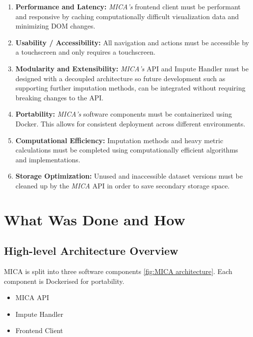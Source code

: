 \documentclass[a4paper, 11pt]{article}
\newcommand{\mica}{\textit{MICA }}
\newcommand{\micas}{\textit{MICA's }}
\begin{document}
\begin{enumerate}[label=N.F.R.\arabic*]

        \item \textbf{Performance and Latency:} \micas frontend client must be
                performant and responsive by caching computationally difficult
                visualization data and minimizing DOM changes.

        \item \textbf{Usability / Accessibility:} All navigation and actions
                must be accessible by a touchscreen and only requires a
                touchscreen.  

        \item \textbf{Modularity and Extensibility:} \micas API and Impute
                Handler must be designed with a decoupled architecture so
                future development such as supporting further imputation
                methods, can be integrated without requiring breaking changes
                to the API.

        \item \textbf{Portability:} \micas software components must be
                containerized using Docker. This allows for consistent
                deployment across different environments.

        \item \textbf{Computational Efficiency:} Imputation methods and heavy
                metric calculations must be completed using computationally
                efficient algorithms and implementations.

        \item \textbf{Storage Optimization:} Unused and inaccessible dataset
                versions must be cleaned up by the \mica API in order to save
                secondary storage space.
\end{enumerate}


\section{What Was Done and How}

\subsection{High-level Architecture Overview}
MICA is split into three software components \cref{fig:MICA architecture}. Each
component is Dockerised for portability.
\begin{itemize}
        \item MICA API 
        \item Impute Handler
        \item Frontend Client
\end{itemize}
\end{document}
